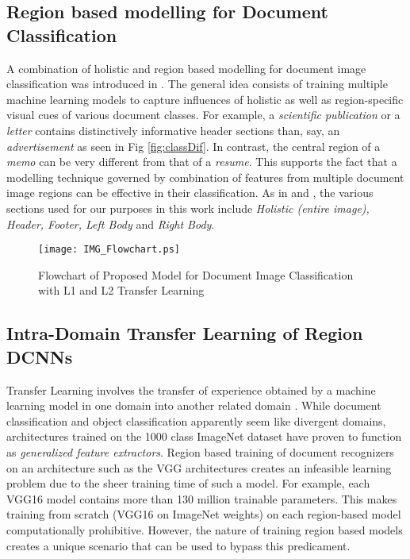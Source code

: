 \documentclass[10pt,conference,a4paper]{IEEEtran}
\begin{document}
\subsection{Region based modelling for Document Classification}
A combination of holistic and region based modelling for document image classification was introduced in \cite{harley2015evaluation}. The general idea consists of training multiple machine learning models to capture influences of holistic as well as region-specific visual cues of various document classes. For example, a \textit{scientific publication} or a \textit{letter} contains distinctively informative header sections than, say, an \textit{advertisement} as seen in Fig \ref{fig:classDif}. In contrast, the central region of a \textit{memo} can be very different from that of a \textit{resume}. This supports the fact that a modelling technique governed by combination of features from multiple document image regions can be effective in their classification. As in \cite{harley2015evaluation} and \cite{roy2016generalized}, the various sections used for our purposes in this work include \textit{Holistic (entire image), Header, Footer, Left Body} and \textit{Right Body}.


\begin{figure}[t]
	\centering
	\texttt{[image: IMG\_Flowchart.ps]}
	\caption{Flowchart of Proposed Model for Document Image Classification with L1 and L2 Transfer Learning} \label{fig:flowchart}
\end{figure}


\subsection{Intra-Domain Transfer Learning of Region DCNNs}
Transfer Learning involves the transfer of experience obtained by a machine learning model in one domain into another related domain \cite{Pan2010}. While document classification and object classification apparently seem like divergent domains, architectures trained on the 1000 class ImageNet dataset have proven to function as \textit{generalized feature extractors}. Region based training of document recognizers on an architecture such as the VGG architectures creates an infeasible learning problem due to the sheer training time of such a model. For example, each VGG16 model contains more than 130 million trainable parameters. This makes training from scratch (VGG16 on ImageNet weights) on each region-based model computationally prohibitive. However, the nature of training region based models creates a unique scenario that can be used to bypass this predicament.
\end{document}

